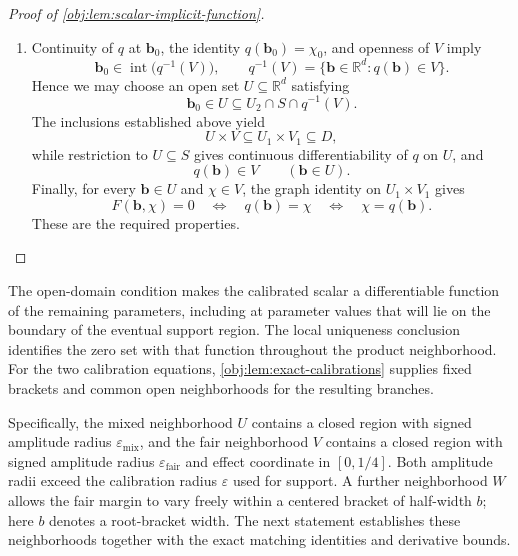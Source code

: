 \documentclass[11pt]{article}
\begin{document}
\begin{proof}[Proof of \cref{obj:lem:scalar-implicit-function}]
\begin{enumerate}
\item Continuity of \(q\) at \(\mathbf b_0\), the identity \(q(\mathbf b_0)=\chi_0\), and openness of \(V\) imply
\[
\mathbf b_0\in\operatorname{int}\bigl(q^{-1}(V)\bigr),
\qquad
q^{-1}(V)=\{\mathbf b\in\mathbb R^d:q(\mathbf b)\in V\}.
\]
Hence we may choose an open set \(U\subseteq\mathbb R^d\) satisfying
\[
\mathbf b_0\in U
\subseteq U_2\cap S\cap q^{-1}(V).
\]
The inclusions established above yield
\[
U\times V\subseteq U_1\times V_1\subseteq D,
\]
while restriction to \(U\subseteq S\) gives continuous differentiability of \(q\) on \(U\), and
\[
q(\mathbf b)\in V
\qquad(\mathbf b\in U).
\]
Finally, for every \(\mathbf b\in U\) and \(\chi\in V\), the graph identity on \(U_1\times V_1\) gives
\[
F(\mathbf b,\chi)=0
\quad\Longleftrightarrow\quad
q(\mathbf b)=\chi
\quad\Longleftrightarrow\quad
\chi=q(\mathbf b).
\]
These are the required properties. %
\end{enumerate}
\end{proof}

The open-domain condition makes the calibrated scalar a differentiable function of the remaining parameters, including at parameter values that will lie on the boundary of the eventual support region. The local uniqueness conclusion identifies the zero set with that function throughout the product neighborhood. For the two calibration equations, \cref{obj:lem:exact-calibrations} supplies fixed brackets and common open neighborhoods for the resulting branches.

Specifically, the mixed neighborhood \(U\) contains a closed region with signed amplitude radius \(\varepsilon_{\mathrm{mix}}\), and the fair neighborhood \(V\) contains a closed region with signed amplitude radius \(\varepsilon_{\mathrm{fair}}\) and effect coordinate in \([0,1/4]\). Both amplitude radii exceed the calibration radius \(\varepsilon\) used for support. A further neighborhood \(W\) allows the fair margin to vary freely within a centered bracket of half-width \(b\); here \(b\) denotes a root-bracket width. The next statement establishes these neighborhoods together with the exact matching identities and derivative bounds.
\end{document}
